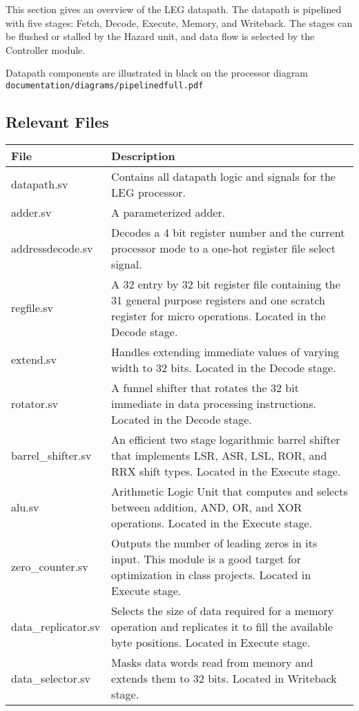 \label{sec:dp}
This section gives an overview of the LEG datapath. 
The datapath is pipelined with five stages: Fetch, Decode, Execute, Memory, and Writeback. 
The stages can be flushed or stalled by the Hazard unit, and data flow is selected by the Controller module.

\noindent Datapath components are illustrated in black on the processor diagram \\\texttt{documentation/diagrams/pipelinedfull.pdf}

\subsection{Relevant Files}

\begin{tabular}{|l|p{120mm}|}
\hline \textbf{File}  & \textbf{Description} \\ 
\hline datapath.sv & Contains all datapath logic and signals for the LEG processor.  \\ 
\hline adder.sv & A parameterized adder. \\ 
\hline addressdecode.sv & Decodes a 4 bit register number and the current processor mode to a one-hot register file select signal. \\ 
\hline regfile.sv & A 32 entry by 32 bit register file containing the 31 general purpose registers and one scratch register for micro operations. Located in the Decode stage. \\ 
\hline extend.sv & Handles extending immediate values of varying width to 32 bits. Located in the Decode stage. \\ 
\hline rotator.sv & A funnel shifter that rotates the 32 bit immediate in data processing instructions. Located in the Decode stage. \\ 
\hline barrel\_shifter.sv & An efficient two stage logarithmic barrel shifter that implements LSR, ASR, LSL, ROR, and RRX shift types. Located in the Execute stage. \\ 
\hline alu.sv & Arithmetic Logic Unit that computes and selects between addition, AND, OR, and XOR operations. Located in the Execute stage. \\ 
\hline zero\_counter.sv & Outputs the number of leading zeros in its input. This module is a good target for optimization in class projects. Located in Execute stage. \\ 
\hline data\_replicator.sv & Selects the size of data required for a memory operation and replicates it to fill the available byte positions. Located in Execute stage. \\ 
\hline data\_selector.sv & Masks data words read from memory and extends them to 32 bits. Located in Writeback stage. \\ 
\hline 
\end{tabular} 

